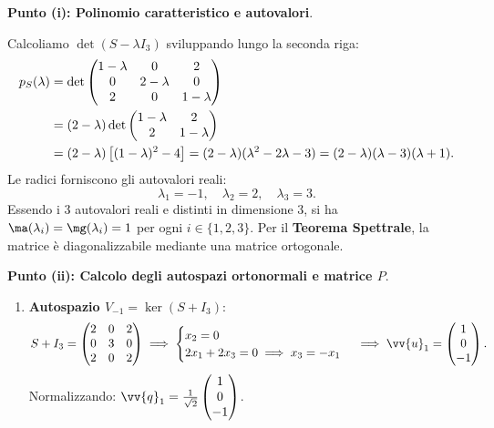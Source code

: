 \begin{dimostrazione}
\textbf{Punto (i): Polinomio caratteristico e autovalori}.

Calcoliamo $\det(S - \lambda I_3)$ sviluppando lungo la seconda riga:
\begin{align}
    p_S(\lambda) &= \det \begin{pmatrix} 1 - \lambda & 0 & 2 \\ 0 & 2 - \lambda & 0 \\ 2 & 0 & 1 - \lambda \end{pmatrix} \notag \\
    &= (2 - \lambda) \det \begin{pmatrix} 1 - \lambda & 2 \\ 2 & 1 - \lambda \end{pmatrix} \notag \\
    &= (2 - \lambda) \left[ (1 - \lambda)^2 - 4 \right] = (2 - \lambda)(\lambda^2 - 2\lambda - 3) = (2 - \lambda)(\lambda - 3)(\lambda + 1).
\end{align}
Le radici forniscono gli autovalori reali:
\begin{equation}
    \lambda_1 = -1, \quad \lambda_2 = 2, \quad \lambda_3 = 3.
\end{equation}
Essendo i 3 autovalori reali e distinti in dimensione 3, si ha $\ma(\lambda_i) = \mg(\lambda_i) = 1$ per ogni $i \in \{1, 2, 3\}$. Per il \textbf{Teorema Spettrale}, la matrice è diagonalizzabile mediante una matrice ortogonale.

\textbf{Punto (ii): Calcolo degli autospazi ortonormali e matrice $P$}.

\begin{enumerate}
    \item \textbf{Autospazio $V_{-1} = \ker(S + I_3)$}:
    \begin{equation}
        S + I_3 = \begin{pmatrix} 2 & 0 & 2 \\ 0 & 3 & 0 \\ 2 & 0 & 2 \end{pmatrix} \implies \begin{cases} x_2 = 0 \\ 2x_1 + 2x_3 = 0 \implies x_3 = -x_1 \end{cases} \implies \vv{u}_1 = \begin{pmatrix} 1 \\ 0 \\ -1 \end{pmatrix}.
    \end{equation}
    Normalizzando: $\vv{q}_1 = \frac{1}{\sqrt{2}} \begin{pmatrix} 1 \\ 0 \\ -1 \end{pmatrix}$.


\end{enumerate}
\end{dimostrazione}
